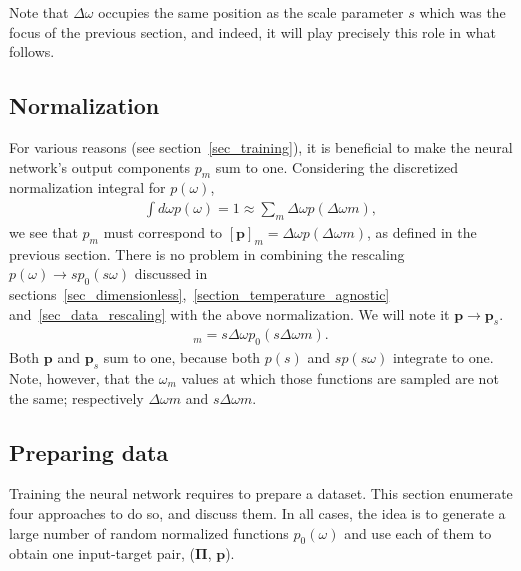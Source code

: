 \documentclass[notitlepage,11pt,nofootinbib]{revtex4-1}
\renewcommand{\vec}[1]{\bm{#1}}
\begin{document}
Note that $\Delta\omega$ occupies the same position as the scale parameter $s$ which was the focus of the previous section, and indeed, it will play precisely this role in what follows.

\subsection{Normalization}
\label{sec_normalization}
For various reasons (see section~\ref{sec_training}), it is beneficial to make the neural network's output components $p_m$ sum to one. Considering the discretized normalization integral for $p(\omega)$,
\begin{align}
\int d\omega p(\omega) = 1 \approx \sum_m \Delta\omega p(\Delta\omega m),
\end{align}
we see that $p_m$ must correspond to $[\vec p]_m = \Delta\omega p(\Delta\omega m)$, as defined in the previous section.
There is no problem in combining the rescaling $p(\omega)\rightarrow sp_0(s\omega)$ discussed in sections~\ref{sec_dimensionless},~\ref{section_temperature_agnostic} and~\ref{sec_data_rescaling} with the above normalization. We will note it $\vec p \rightarrow \vec p_s$.
\begin{align}
    [\vec p_s]_m = s\Delta\omega p_0(s\Delta\omega m).
\end{align}
Both $\vec p$ and $\vec p_s$ sum to one, because both $p(s)$ and $sp(s\omega)$ integrate to one. Note, however, that the $\omega_m$ values at which those functions are sampled are not the same; respectively $\Delta\omega m$ and $s\Delta\omega m$.


\subsection{Preparing data}

Training the neural network requires to prepare a dataset. This section enumerate four approaches to do so, and discuss them. In all cases, the idea is to generate a large number of random normalized functions $p_0(\omega)$ and use each of them to obtain one input-target pair, ($\vec \Pi$, $\vec p$).
\end{document}
